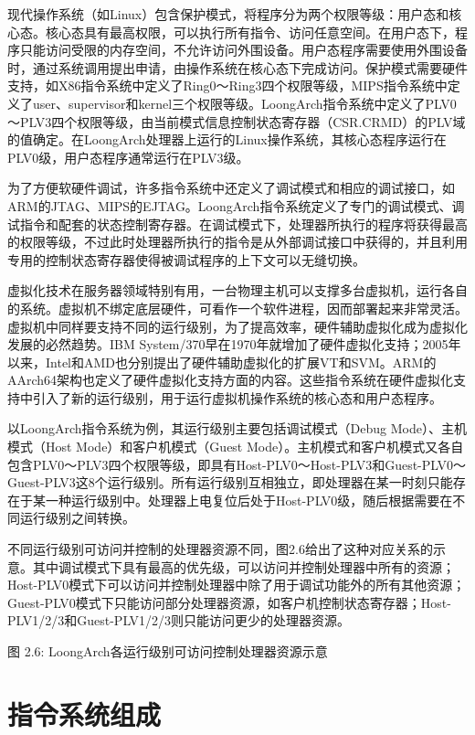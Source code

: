 \documentclass[]{ctexbook}
\begin{document}
现代操作系统（如Linux）包含保护模式，将程序分为两个权限等级：用户态和核心态。核心态具有最高权限，可以执行所有指令、访问任意空间。在用户态下，程序只能访问受限的内存空间，不允许访问外围设备。用户态程序需要使用外围设备时，通过系统调用提出申请，由操作系统在核心态下完成访问。保护模式需要硬件支持，如X86指令系统中定义了Ring0～Ring3四个权限等级，MIPS指令系统中定义了user、supervisor和kernel三个权限等级。LoongArch指令系统中定义了PLV0～PLV3四个权限等级，由当前模式信息控制状态寄存器（CSR.CRMD）的PLV域的值确定。在LoongArch处理器上运行的Linux操作系统，其核心态程序运行在PLV0级，用户态程序通常运行在PLV3级。

为了方便软硬件调试，许多指令系统中还定义了调试模式和相应的调试接口，如ARM的JTAG、MIPS的EJTAG。LoongArch指令系统定义了专门的调试模式、调试指令和配套的状态控制寄存器。在调试模式下，处理器所执行的程序将获得最高的权限等级，不过此时处理器所执行的指令是从外部调试接口中获得的，并且利用专用的控制状态寄存器使得被调试程序的上下文可以无缝切换。

虚拟化技术在服务器领域特别有用，一台物理主机可以支撑多台虚拟机，运行各自的系统。虚拟机不绑定底层硬件，可看作一个软件进程，因而部署起来非常灵活。虚拟机中同样要支持不同的运行级别，为了提高效率，硬件辅助虚拟化成为虚拟化发展的必然趋势。IBM System/370早在1970年就增加了硬件虚拟化支持；2005年以来，Intel和AMD也分别提出了硬件辅助虚拟化的扩展VT和SVM。ARM的AArch64架构也定义了硬件虚拟化支持方面的内容。这些指令系统在硬件虚拟化支持中引入了新的运行级别，用于运行虚拟机操作系统的核心态和用户态程序。

以LoongArch指令系统为例，其运行级别主要包括调试模式（Debug Mode）、主机模式（Host Mode）和客户机模式（Guest Mode）。主机模式和客户机模式又各自包含PLV0～PLV3四个权限等级，即具有Host-PLV0～Host-PLV3和Guest-PLV0～Guest-PLV3这8个运行级别。所有运行级别互相独立，即处理器在某一时刻只能存在于某一种运行级别中。处理器上电复位后处于Host-PLV0级，随后根据需要在不同运行级别之间转换。

不同运行级别可访问并控制的处理器资源不同，图2.6给出了这种对应关系的示意。其中调试模式下具有最高的优先级，可以访问并控制处理器中所有的资源；Host-PLV0模式下可以访问并控制处理器中除了用于调试功能外的所有其他资源；Guest-PLV0模式下只能访问部分处理器资源，如客户机控制状态寄存器；Host-PLV1/2/3和Guest-PLV1/2/3则只能访问更少的处理器资源。

图 2.6: LoongArch各运行级别可访问控制处理器资源示意

\hypertarget{ux6307ux4ee4ux7cfbux7edfux7ec4ux6210}{%
\section{指令系统组成}\label{ux6307ux4ee4ux7cfbux7edfux7ec4ux6210}}
\end{document}
